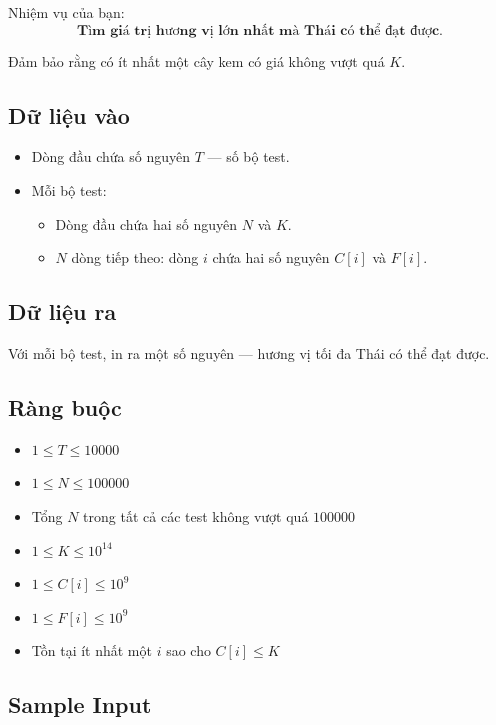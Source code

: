 Nhiệm vụ của bạn:  
\[
\textbf{Tìm giá trị hương vị lớn nhất mà Thái có thể đạt được.}
\]

Đảm bảo rằng có ít nhất một cây kem có giá không vượt quá $K$.

\subsection*{Dữ liệu vào}

\begin{itemize}
    \item Dòng đầu chứa số nguyên $T$ — số bộ test.
    \item Mỗi bộ test:
    \begin{itemize}
        \item Dòng đầu chứa hai số nguyên $N$ và $K$.
        \item $N$ dòng tiếp theo: dòng $i$ chứa hai số nguyên $C[i]$ và $F[i]$.
    \end{itemize}
\end{itemize}

\subsection*{Dữ liệu ra}

Với mỗi bộ test, in ra một số nguyên — hương vị tối đa Thái có thể đạt được.

\subsection*{Ràng buộc}

\begin{itemize}
    \item $1 \le T \le 10000$
    \item $1 \le N \le 100000$
    \item Tổng $N$ trong tất cả các test không vượt quá $100000$
    \item $1 \le K \le 10^{14}$
    \item $1 \le C[i] \le 10^9$
    \item $1 \le F[i] \le 10^9$
    \item Tồn tại ít nhất một $i$ sao cho $C[i] \le K$
\end{itemize}

\subsection*{Sample Input}

